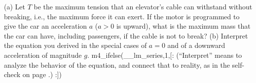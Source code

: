 (a) Let $T$ be the maximum tension that an elevator's
cable can withstand without breaking, i.e., the maximum force
it can exert. If the motor is programmed to give the car an
acceleration $a$ ($a>0$ is upward), what is the maximum mass that the car can
have, including passengers, if the cable is not to break?\answercheck\hwendpart
(b) Interpret the equation you derived in the special cases
of $a=0$ and of a downward acceleration of magnitude $g$.
m4_ifelse(__lm_series,1,[:%
(``Interpret'' means
to analyze the behavior of the equation, and connect that to reality, as
in the self-check on page \pageref{sc:interpret-terminal-v}.)
:])

